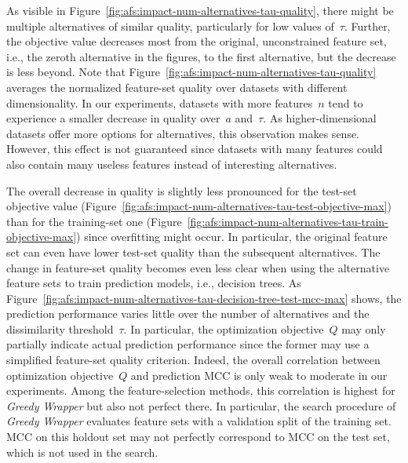 \documentclass[iicol, sn-basic, Numbered]{sn-jnl} %
\theoremstyle{plain}
\theoremstyle{definition}
\begin{document}
As visible in Figure~\ref{fig:afs:impact-num-alternatives-tau-quality}, there might be multiple alternatives of similar quality, particularly for low values of~$\tau$.
Further, the objective value decreases most from the original, unconstrained feature set, i.e., the zeroth alternative in the figures, to the first alternative, but the decrease is less beyond.
Note that Figure~\ref{fig:afs:impact-num-alternatives-tau-quality} averages the normalized feature-set quality over datasets with different dimensionality.
In our experiments, datasets with more features~$n$ tend to experience a smaller decrease in quality over~$a$ and~$\tau$.
As higher-dimensional datasets offer more options for alternatives, this observation makes sense.
However, this effect is not guaranteed since datasets with many features could also contain many useless features instead of interesting alternatives.

The overall decrease in quality is slightly less pronounced for the test-set objective value (Figure~\ref{fig:afs:impact-num-alternatives-tau-test-objective-max}) than for the training-set one (Figure~\ref{fig:afs:impact-num-alternatives-tau-train-objective-max}) since overfitting might occur.
In particular, the original feature set can even have lower test-set quality than the subsequent alternatives.
The change in feature-set quality becomes even less clear when using the alternative feature sets to train prediction models, i.e., decision trees.
As Figure~\ref{fig:afs:impact-num-alternatives-tau-decision-tree-test-mcc-max} shows, the prediction performance varies little over the number of alternatives and the dissimilarity threshold~$\tau$.
In particular, the optimization objective~$Q$ may only partially indicate actual prediction performance since the former may use a simplified feature-set quality criterion.
Indeed, the overall correlation between optimization objective~$Q$ and prediction MCC is only weak to moderate in our experiments.
Among the feature-selection methods, this correlation is highest for \emph{Greedy Wrapper} but also not perfect there.
In particular, the search procedure of \emph{Greedy Wrapper} evaluates feature sets with a validation split of the training set.
MCC on this holdout set may not perfectly correspond to MCC on the test set, which is not used in the search.
\end{document}
